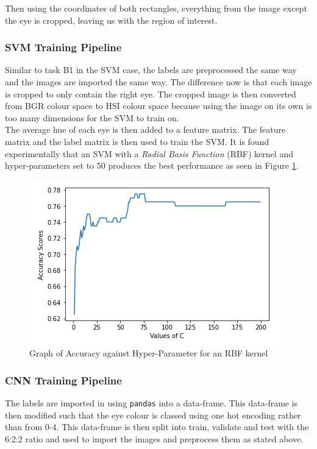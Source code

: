\documentclass{article}
\begin{document}
	Then using the coordinates of both rectangles, everything from the image except the eye is cropped, leaving us with the region of interest.  
	\subsubsection{SVM Training Pipeline}
	Similar to task B1 in the SVM case, the labels are preprocessed the same way and the images are imported the same way. The difference now is that each image is cropped to only contain the right eye. The cropped image is then converted from BGR colour space to HSI colour space because using the image on its own is too many dimensions for the SVM to train on.\\
	
	The average hue of each eye is then added to a feature matrix. The feature matrix and the label matrix is then used to train the SVM. It is found experimentally that an SVM with a \textit{Radial Basis Function} (RBF) kernel and hyper-parameters set to 50 produces the best performance as seen in Figure \ref{fig:B2_SVM}.
	\begin{figure}[htb]
		\centering
		\includegraphics[scale=0.7]{Figures/B2_SVM_C.PNG}
		\caption{Graph of Accuracy against Hyper-Parameter for an RBF kernel}
		\label{fig:B2_SVM}
	\end{figure}
	\subsubsection{CNN Training Pipeline}
	The labels are imported in using \verb|pandas| into a data-frame. This data-frame is then modified such that the eye colour is classed using one hot encoding rather than from 0-4. This data-frame is then split into train, validate and test with the 6:2:2 ratio and used to import the images and preprocess them as stated above.\\
	
\end{document}
